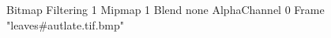 {Bitmap
	{Filtering 1}
	{Mipmap 1}
	{Blend none}
	{AlphaChannel 0}
	{Frame "leaves#autlate.tif.bmp"}
}
